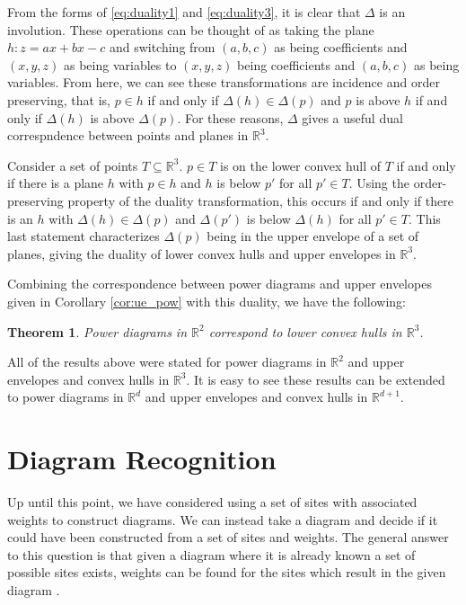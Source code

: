 \documentclass[a4paper, 11pt]{article}
\newtheorem{theorem}{Theorem}[section]
\newcommand{\R}{\mathbb{R}}
\begin{document}
From the forms of \eqref{eq:duality1} and \eqref{eq:duality3}, it is clear that $\Delta$ is an involution. These operations can be thought of as
taking the plane $h: z = ax + bx - c$ and switching from $(a,b,c)$ as being coefficients and $(x,y,z)$ as being variables to $(x,y,z)$ being
coefficients and $(a,b,c)$ as being variables. From here, we can see these transformations are incidence and order preserving, that is, $p \in h$ if and only if
$\Delta(h) \in \Delta(p)$ and $p$ is above $h$ if and only if $\Delta(h)$ is above $\Delta(p)$. For these reasons, $\Delta$ gives a useful dual
correspndence between points and planes in $\R^3$.

Consider a set of points $T \subseteq \R^3$. $p \in T$ is on the lower convex hull of $T$ if and only if there is a plane $h$ with $p \in h$ and $h$
is below $p'$ for all $p' \in T$. Using the order-preserving property of the duality transformation, this occurs if and only if there is an $h$ with $\Delta(h) \in
\Delta(p)$ and $\Delta(p')$ is below $\Delta(h)$ for all $p' \in T$. This last statement characterizes $\Delta(p)$ being in the upper envelope of a set of
planes, giving the duality of lower convex hulls and upper envelopes in $\R^3$.

Combining the correspondence between power diagrams and upper envelopes given in Corollary \ref{cor:ue_pow} with this duality, we have the following:

\begin{theorem}
  Power diagrams in $\R^2$ correspond to lower convex hulls in $\R^3$.
  \label{thm:ch_pow}
\end{theorem}

All of the results above were stated for power diagrams in $\R^2$ and upper envelopes and convex hulls in $\R^3$. It is easy to see these results can
be extended to power diagrams in $\R^d$ and upper envelopes and convex hulls in $\R^{d+1}$.

\section{Diagram Recognition}

Up until this point, we have considered using a set of sites with associated weights to construct diagrams. We can instead take a diagram and decide
if it could have been constructed from a set of sites and weights. The general answer to this question is that given a diagram where it is already
known a set of possible sites exists, weights can be found for the sites which result in the given diagram \cite{ash-bolker}.
\end{document}
